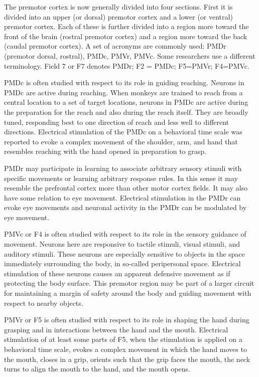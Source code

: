 \documentclass[]{book}
\begin{document}
The premotor cortex is now generally divided into four sections. First it is divided into an upper (or dorsal) premotor cortex and a lower (or ventral) premotor cortex. Each of these is further divided into a region more toward the front of the brain (rostral premotor cortex) and a region more toward the back (caudal premotor cortex). A set of acronyms are commonly used: PMDr (premotor dorsal, rostral), PMDc, PMVr, PMVc. Some researchers use a different terminology. Field 7 or F7 denotes PMDr; F2 = PMDc; F5=PMVr; F4=PMVc.

PMDc is often studied with respect to its role in guiding reaching. Neurons in PMDc are active during reaching. When monkeys are trained to reach from a central location to a set of target locations, neurons in PMDc are active during the preparation for the reach and also during the reach itself. They are broadly tuned, responding best to one direction of reach and less well to different directions. Electrical stimulation of the PMDc on a behavioral time scale was reported to evoke a complex movement of the shoulder, arm, and hand that resembles reaching with the hand opened in preparation to grasp.

PMDr may participate in learning to associate arbitrary sensory stimuli with specific movements or learning arbitrary response rules. In this sense it may resemble the prefrontal cortex more than other motor cortex fields. It may also have some relation to eye movement. Electrical stimulation in the PMDr can evoke eye movements and neuronal activity in the PMDr can be modulated by eye movement.

PMVc or F4 is often studied with respect to its role in the sensory guidance of movement. Neurons here are responsive to tactile stimuli, visual stimuli, and auditory stimuli. These neurons are especially sensitive to objects in the space immediately surrounding the body, in so-called peripersonal space. Electrical stimulation of these neurons causes an apparent defensive movement as if protecting the body surface. This premotor region may be part of a larger circuit for maintaining a margin of safety around the body and guiding movement with respect to nearby objects.

PMVr or F5 is often studied with respect to its role in shaping the hand during grasping and in interactions between the hand and the mouth. Electrical stimulation of at least some parts of F5, when the stimulation is applied on a behavioral time scale, evokes a complex movement in which the hand moves to the mouth, closes in a grip, orients such that the grip faces the mouth, the neck turns to align the mouth to the hand, and the mouth opens.
\end{document}
